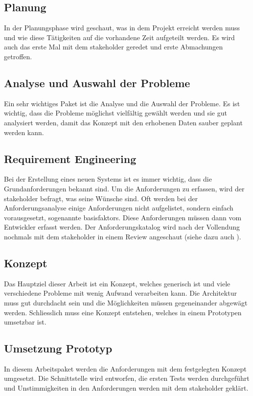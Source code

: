 \subsection{Planung}\label{planung}
In der Planungsphase wird geschaut, was in dem Projekt erreicht werden muss und wie diese Tätigkeiten auf die vorhandene Zeit aufgeteilt werden. Es wird auch das erste Mal mit dem 
\gls{stakeholder} geredet und erste Abmachungen getroffen.

\subsection{Analyse und Auswahl der Probleme}\label{analyse_auswahl_probleme}
Ein sehr wichtiges Paket ist die Analyse und die Auswahl der Probleme. Es ist wichtig, dass die Probleme möglichst vielfältig gewählt werden und sie gut analysiert werden, damit das Konzept 
mit den erhobenen Daten sauber geplant werden kann.

\subsection{Requirement Engineering}\label{rqe}
Bei der Erstellung eines neuen Systems ist es immer wichtig, dass die Grundanforderungen bekannt sind. Um die Anforderungen zu erfassen, wird der \gls{stakeholder} befragt, was seine Wünsche 
sind. Oft werden bei der Anforderungsanalyse einige Anforderungen nicht aufgelistet, sondern einfach vorausgesetzt, sogenannte \glspl{basisfaktor}. Diese Anforderungen müssen dann vom 
Entwickler erfasst werden. Der Anforderungskatalog wird nach der Vollendung nochmals mit dem \gls{stakeholder} in einem Review angeschaut (siehe dazu auch \cite{req_eng_book}).

\subsection{Konzept}\label{ref_backend}
Das Hauptziel dieser Arbeit ist ein Konzept, welches generisch ist und viele verschiedene Probleme mit wenig Aufwand verarbeiten kann. Die Architektur muss gut durchdacht sein und die 
Möglichkeiten müssen gegeneinander abgewägt werden. Schliesslich muss eine Konzept entstehen, welches in einem Prototypen umsetzbar ist.

\subsection{Umsetzung Prototyp}\label{eng_prototyp}
In diesem Arbeitspaket werden die Anforderungen mit dem festgelegten Konzept umgesetzt. Die Schnittstelle wird entworfen, die ersten Tests werden durchgeführt und Unstimmigkeiten in den 
Anforderungen werden mit dem \gls{stakeholder} geklärt.

